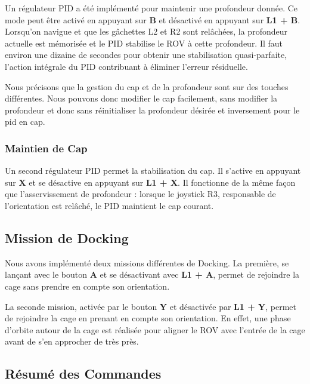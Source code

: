 \begin{appendices}
Un régulateur PID a été implémenté pour maintenir une profondeur donnée. Ce mode peut être activé en appuyant sur \textbf{B} et désactivé en appuyant sur \textbf{L1 + B}. Lorsqu'on navigue et que les gâchettes L2 et R2 sont relâchées, la profondeur actuelle est mémorisée et le PID stabilise le ROV à cette profondeur. Il faut environ une dizaine de secondes pour obtenir une stabilisation quasi-parfaite, l'action intégrale du PID contribuant à éliminer l'erreur résiduelle.

Nous précisons que la gestion du cap et de la profondeur sont sur des touches différentes. Nous pouvons donc modifier le cap facilement, sans modifier la profondeur et donc sans réinitialiser la profondeur désirée et inversement pour le pid en cap.

\subsubsection{Maintien de Cap}

Un second régulateur PID permet la stabilisation du cap. Il s'active en appuyant sur \textbf{X} et se désactive en appuyant sur \textbf{L1 + X}. Il fonctionne de la même façon que l'asservissement de profondeur : lorsque le joystick R3, responsable de l'orientation est relâché, le PID maintient le cap courant.

\subsection{Mission de Docking}

Nous avons implémenté deux missions différentes de Docking. La première, se lançant avec le bouton \textbf{A} et se désactivant avec \textbf{L1 + A}, permet de rejoindre la cage sans prendre en compte son orientation.

La seconde mission, activée par le bouton \textbf{Y} et désactivée par \textbf{L1 + Y}, permet de rejoindre la cage en prenant en compte son orientation. En effet, une phase d'orbite autour de la cage est réalisée pour aligner le ROV avec l'entrée de la cage avant de s'en approcher de très près.

\subsection{Résumé des Commandes}


\end{appendices}
